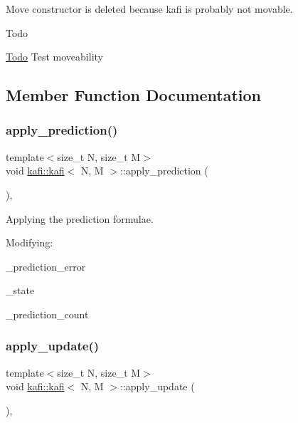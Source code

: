 Move constructor is deleted because kafi is probably not movable. 

\begin{DoxyRefDesc}{Todo}
\item[\hyperlink{todo__todo000003}{Todo}]Test moveability \end{DoxyRefDesc}


\subsection{Member Function Documentation}
\mbox{\label{classkafi_1_1kafi_a0e5b7cf6b263950c54270e27287f24f2}} 
\subsubsection{\texorpdfstring{apply\+\_\+prediction()}{apply\_prediction()}}
{\footnotesize\ttfamily template$<$size\+\_\+t N, size\+\_\+t M$>$ \\
void \hyperlink{classkafi_1_1kafi}{kafi\+::kafi}$<$ N, M $>$\+::apply\+\_\+prediction (\begin{DoxyParamCaption}{ }\end{DoxyParamCaption})\hspace{0.3cm}{\ttfamily [inline]}, {\ttfamily [private]}}



Applying the prediction formulae. 

Modifying\+:
\begin{DoxyItemize}
\item {\ttfamily \+\_\+prediction\+\_\+error}
\item {\ttfamily \+\_\+state}
\item {\ttfamily \+\_\+prediction\+\_\+count} 
\end{DoxyItemize}\mbox{\label{classkafi_1_1kafi_a4e90a69f858c0c49f7fde168561da254}} 
\subsubsection{\texorpdfstring{apply\+\_\+update()}{apply\_update()}}
{\footnotesize\ttfamily template$<$size\+\_\+t N, size\+\_\+t M$>$ \\
void \hyperlink{classkafi_1_1kafi}{kafi\+::kafi}$<$ N, M $>$\+::apply\+\_\+update (\begin{DoxyParamCaption}{ }\end{DoxyParamCaption})\hspace{0.3cm}{\ttfamily [inline]}, {\ttfamily [private]}}



